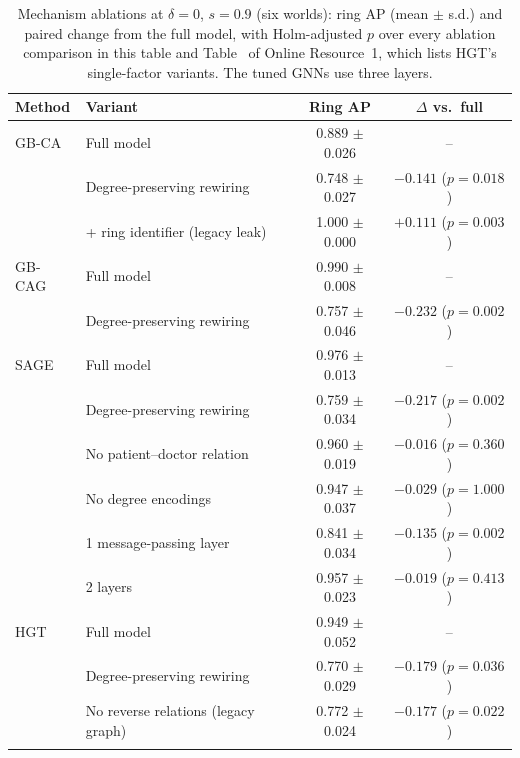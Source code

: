 \documentclass[pdflatex,sn-vancouver-num]{sn-jnl}
\begin{document}
\begin{table}[h]
\caption{Mechanism ablations at $\delta=0$, $s=0.9$ (six worlds): ring AP (mean $\pm$ s.d.) and paired change from the full model, with Holm-adjusted $p$ over every ablation comparison in this table and Table~\STabHGT{} of Online Resource~1, which lists HGT's single-factor variants. The tuned GNNs use three layers.}\label{tab:ablation}
\scriptsize
\begin{tabular}{@{}llcc@{}}
\toprule
Method & Variant & Ring AP & $\Delta$ vs.\ full \\
\midrule
GB-CA & Full model & 0.889 $\pm$ 0.026 & -- \\
 & Degree-preserving rewiring & 0.748 $\pm$ 0.027 & $-0.141$ ($p=0.018$) \\
 & + ring identifier (legacy leak) & 1.000 $\pm$ 0.000 & $+0.111$ ($p=0.003$) \\
\midrule
GB-CAG & Full model & 0.990 $\pm$ 0.008 & -- \\
 & Degree-preserving rewiring & 0.757 $\pm$ 0.046 & $-0.232$ ($p=0.002$) \\
\midrule
SAGE & Full model & 0.976 $\pm$ 0.013 & -- \\
 & Degree-preserving rewiring & 0.759 $\pm$ 0.034 & $-0.217$ ($p=0.002$) \\
 & No patient--doctor relation & 0.960 $\pm$ 0.019 & $-0.016$ ($p=0.360$) \\
 & No degree encodings & 0.947 $\pm$ 0.037 & $-0.029$ ($p=1.000$) \\
 & 1 message-passing layer & 0.841 $\pm$ 0.034 & $-0.135$ ($p=0.002$) \\
 & 2 layers & 0.957 $\pm$ 0.023 & $-0.019$ ($p=0.413$) \\
\midrule
HGT & Full model & 0.949 $\pm$ 0.052 & -- \\
 & Degree-preserving rewiring & 0.770 $\pm$ 0.029 & $-0.179$ ($p=0.036$) \\
 & No reverse relations (legacy graph) & 0.772 $\pm$ 0.024 & $-0.177$ ($p=0.022$) \\
\botrule
\end{tabular}
\end{table}
\end{document}
